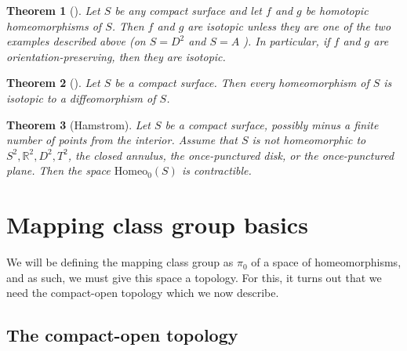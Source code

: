 \documentclass[reqno]{amsart}
\newtheorem{theorem}{Theorem}[section]
\theoremstyle{definition}
\theoremstyle{remark}
\newcommand{\Homeo}{{\mathrm{Homeo}}}
\begin{document}
\begin{theorem}[]
    Let $S$ be any compact surface and let $f$ and $g$ be
    homotopic homeomorphisms of $S$. Then $f$ and $g$ are
    isotopic unless they are one of the two examples described
    above (on $S = D^2$ and $S = A$ ). In particular,
    if $f$ and $g$ are orientation-preserving, then they
    are isotopic.
\end{theorem}



\begin{theorem}[]
    Let $S$ be a compact surface. Then every homeomorphism of
    $S$ is isotopic to a diffeomorphism of $S$.
\end{theorem}

\begin{theorem}[Hamstrom]
    Let $S$ be a compact surface, possibly minus a finite
    number of points from the interior. Assume that
    $S$ is not homeomorphic to
    $S^2, \mathbb{R}^2, D^2, T^2$, the closed annulus,
    the once-punctured disk, or the once-punctured plane. Then
    the space $\Homeo_0 (S)$ is contractible.
\end{theorem}




\newpage

\section{Mapping class group basics}

We will be defining the mapping class group as $\pi_0$
of a space of homeomorphisms, and as such, we must
give this space a topology. For this, it turns out that we need
the compact-open topology which we now describe.

\subsection{The compact-open topology}
\end{document}
